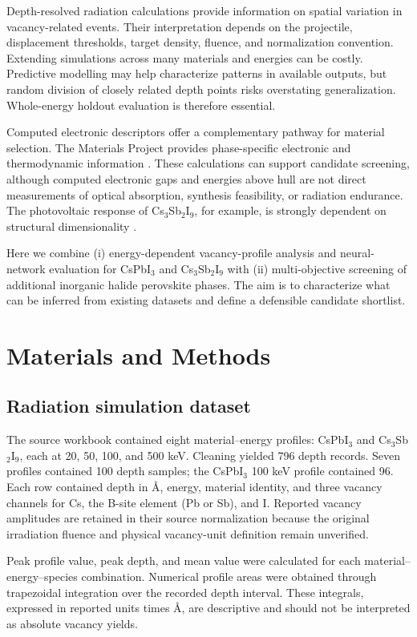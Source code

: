 \documentclass[10pt,letterpaper,twocolumn]{article}
\begin{document}
Depth-resolved radiation calculations provide information on spatial variation in vacancy-related events. Their interpretation depends on the projectile, displacement thresholds, target density, fluence, and normalization convention. Extending simulations across many materials and energies can be costly. Predictive modelling may help characterize patterns in available outputs, but random division of closely related depth points risks overstating generalization. Whole-energy holdout evaluation is therefore essential.

Computed electronic descriptors offer a complementary pathway for material selection. The Materials Project provides phase-specific electronic and thermodynamic information \cite{horton2025}. These calculations can support candidate screening, although computed electronic gaps and energies above hull are not direct measurements of optical absorption, synthesis feasibility, or radiation endurance. The photovoltaic response of Cs$_3$Sb$_2$I$_9$, for example, is strongly dependent on structural dimensionality \cite{guo2025}.

Here we combine (i) energy-dependent vacancy-profile analysis and neural-network evaluation for CsPbI$_3$ and Cs$_3$Sb$_2$I$_9$ with (ii) multi-objective screening of additional inorganic halide perovskite phases. The aim is to characterize what can be inferred from existing datasets and define a defensible candidate shortlist.

\section{Materials and Methods}
\subsection{Radiation simulation dataset}
The source workbook contained eight material--energy profiles: CsPbI$_3$ and Cs$_3$Sb$_2$I$_9$, each at 20, 50, 100, and 500 keV. Cleaning yielded 796 depth records. Seven profiles contained 100 depth samples; the CsPbI$_3$ 100 keV profile contained 96. Each row contained depth in \AA, energy, material identity, and three vacancy channels for Cs, the B-site element (Pb or Sb), and I. Reported vacancy amplitudes are retained in their source normalization because the original irradiation fluence and physical vacancy-unit definition remain unverified.

Peak profile value, peak depth, and mean value were calculated for each material--energy--species combination. Numerical profile areas were obtained through trapezoidal integration over the recorded depth interval. These integrals, expressed in reported units times \AA, are descriptive and should not be interpreted as absolute vacancy yields.
\end{document}
